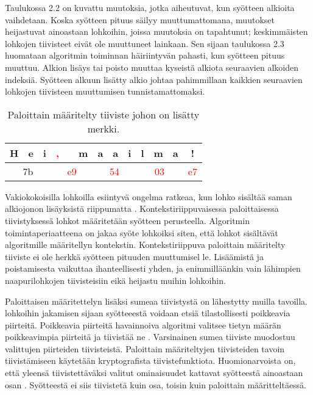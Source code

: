Taulukossa 2.2 on kuvattu muutoksia, jotka aiheutuvat, kun syötteen
alkioita vaihdetaan. Koska syötteen pituus säilyy muuttumattomana, muutokset
heijastuvat ainoastaan lohkoihin, joissa muutoksia on tapahtunut; keskimmäisten
lohkojen tiivisteet eivät ole muuttuneet lainkaan. Sen sijaan taulukossa 2.3
huomataan algoritmin toiminnan häiriintyvän pahasti, kun syötteen pituus muuttuu.
Alkion lisäys tai poisto muuttaa kyseistä alkiota seuraavien alkoiden indeksiä.
Syötteen alkuun lisätty alkio johtaa pahimmillaan kaikkien seuraavien lohkojen
tiivisteen muuttumisen tunnistamattomaksi.

\begin{table}[h]
   \centering
   \caption{Paloittain määritelty tiiviste johon on lisätty merkki.}
   \begin{tabular}{|c|c|c|c|c|c|c|c|c|c|c|c|c|} 
      \hline
      H & e & i                  & \textcolor{red}{,} &  & m                & a & a & i                                & l & m & a                                & !                    \\ 
      \hline
      \multicolumn{3}{|c|}{7b}   & \multicolumn{3}{c|}{\textcolor{red}{e9}} & \multicolumn{3}{c|}{\textcolor{red}{54}} & \multicolumn{3}{c|}{\textcolor{red}{03}} & \textcolor{red}{e7}  \\
      \hline
   \end{tabular}
\end{table}

Vakiokokoisilla lohkoilla esiintyvä ongelma ratkeaa, kun lohko sisältää saman
alkiojonon lisäyksistä riippumatta \parencite{kornblum06}. Kontekstiriippuvaisessa paloittaisessa tiivistyksessä
lohkot määritetään syötteen perusteella. Algoritmin toimintaperiaatteena on jakaa syöte
lohkoiksi siten, että lohkot sisältävät algoritmille määritellyn kontekstin.
Kontekstiriippuva paloittain määritelty tiiviste ei ole herkkä syötteen pituuden
muuttumisel le. Lisäämistä ja poistamisesta vaikuttaa ihanteellisesti yhden,
ja enimmilläänkin vain lähimpien naapurilohkojen tiivisteisiin eikä heijastu muihin lohkoihin.

Paloittaisen määritettelyn lisäksi sumeaa tiivistystä on lähestytty muilla tavoilla.
lohkoihin jakamisen sijaan syötteeestä voidaan etsiä tilastollisesti poikkeavia
piirteitä. Poikkeavia piirteitä havainnoiva algoritmi valitsee tietyn määrän
poikkeavimpia piirteitä ja tiivistää ne \citep{roussev10}. Varsinainen sumea tiiviste muodostuu
valittujen piirteiden tiivisteistä. Paloittain määriteltyjen tiivisteiden tavoin
tiivistämiseen käytetään kryptografista tiivistefunktiota. Huomionarvoista on,
että yleensä tiivistettäväksi valitut ominaisuudet kattavat syötteestä ainoastaan osan \citep{martin-perez21}.
Syötteestä ei siis tiivistetä kuin osa, toisin kuin paloittain määritteltäessä.

